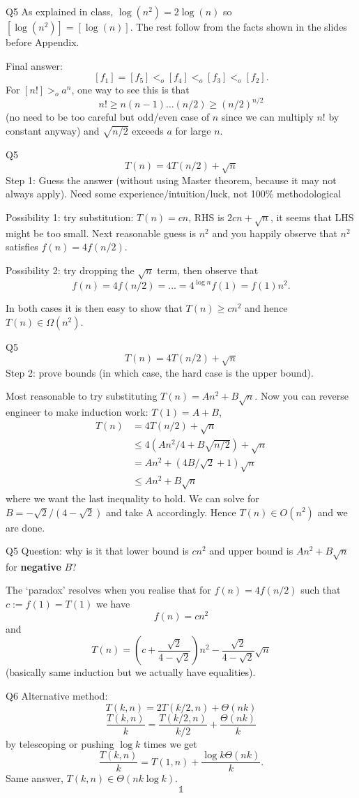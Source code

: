 \documentclass[t]{beamer}
\def\le{\leqslant}
\def\ge{\geqslant}
\begin{document}
\begin{frame}{Q5}
  As explained in class, $\log(n^2)=2\log(n)$ so $[\log(n^2)]= [\log(n)]$. The rest follow from the facts shown in the slides before Appendix. 
  \par Final answer:
  \[[f_1]=[f_5]<_o [f_4] <_o [f_3] <_o [f_2]. \]
  For $[n!] >_o a^n$, one way to see this is that 
  \[n! \ge n(n-1)\dots(n/2) \ge (n/2)^{n/2}\]
  (no need to be too careful but odd/even case of $n$ since we can multiply $n!$ by constant anyway) and $\sqrt{n/2}$ exceeds $a$ for large $n$. 
\end{frame}

\begin{frame}{Q5}
  \[T(n)=4T(n/2)+\sqrt{n}\]
  Step 1: Guess the answer (without using Master theorem, because it may not always apply). Need some experience/intuition/luck, not 100\% methodological
  \par Possibility 1: try substitution: $T(n)=cn$, RHS is $2cn+\sqrt{n}$, it seems that LHS might be too small. Next reasonable guess is $n^2$ and you happily observe that $n^2$ satisfies $f(n)=4f(n/2)$. 
  \par Possibility 2: try dropping the $\sqrt{n}$ term, then observe that 
  \[f(n)=4f(n/2)=\dots=4^{\log{n}}f(1) = f(1)n^2.\]
  \par In both cases it is then easy to show that $T(n) \ge cn^2$ and hence $T(n) \in \Omega(n^2)$. 
\end{frame}
\begin{frame}{Q5}
  \[T(n)=4T(n/2)+\sqrt{n}\]
  Step 2: prove bounds (in which case, the hard case is the upper bound). 
  \par Most reasonable to try substituting $T(n)=An^2+B\sqrt{n}$. Now you can reverse engineer to make induction work:
  $T(1)=A+B$, 
  \begin{align*}
    T(n) &= 4T(n/2)+\sqrt{n} \\ 
    &\le 4\left(An^2/4+B\sqrt{n/2}\right)+\sqrt{n} \\
    &=An^2+(4B/\sqrt{2}+1)\sqrt{n} \\
    &\le An^2+B\sqrt{n}
  \end{align*}
  where we want the last inequality to hold. We can solve for $B=-\sqrt{2}/(4-\sqrt{2})$ and take A accordingly. Hence $T(n) \in O(n^2)$ and we are done. 
\end{frame}
\begin{frame}{Q5}
  Question: why is it that lower bound is $cn^2$ and upper bound is $An^2+B\sqrt{n}$ for \textbf{negative} $B$?
  \par The `paradox' resolves when you realise that for $f(n)=4f(n/2)$ such that $c := f(1)=T(1)$ we have
  \[f(n) = cn^2\] 
  and
  \[T(n) = \left(c+\frac{\sqrt{2}}{4-\sqrt{2}}\right)n^2-\frac{\sqrt{2}}{4-\sqrt{2}}\sqrt{n}\]
  (basically same induction but we actually have equalities). 
\end{frame}
\begin{frame}{Q6}
  Alternative method: 
  \[T(k, n) = 2T(k/2, n)+\Theta(nk)\]
  \[\frac{T(k, n)}{k} = \frac{T(k/2, n)}{k/2}+\frac{\Theta(nk)}{k}\]
  by telescoping or pushing $\log{k}$ times we get
  \[\frac{T(k, n)}{k} = T(1, n)+\frac{\log{k}\Theta(nk)}{k}. \]
  Same answer, $T(k, n) \in \Theta(nk\log{k})$.
  \[\mathbb{1}\]
\end{frame}
\end{document}
